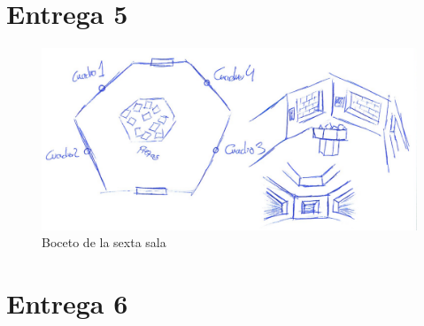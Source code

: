 \section{Entrega 5}

\begin{figure}[!h]
\begin{center}
\includegraphics[width=1\textwidth]{imagenes/7/bocetos/boceto-sala-6.png}
\caption{Boceto de la sexta sala}
\label{fig:bocetos-salas-6}
\end{center}
\end{figure}

\section{Entrega 6}

